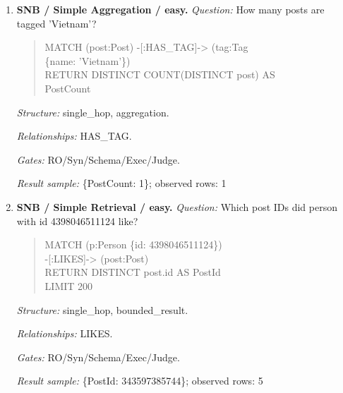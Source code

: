 \begin{enumerate}
\begin{quote}
RETURN DISTINCT e.id AS TargetId, e.name\\
AS TargetName, relatedCount\\
ORDER BY relatedCount DESC\\
LIMIT 10
\end{quote}
\textit{Structure:} single\_hop, aggregation, order\_rank, bounded\_result.\par
\textit{Relationships:} IS\_LOCATED\_IN.\par
\textit{Gates:} RO/Syn/Schema/Exec/Judge.\par
\textit{Result sample:} \{TargetId: 164, TargetName: Kolkata, relatedCount: 130\}; observed rows: 10
\item \textbf{SNB / Simple Aggregation / easy.}
\textit{Question:} How many posts are tagged 'Vietnam'?
\begin{quote}\scriptsize\ttfamily\raggedright\sloppy
MATCH (post:Post) -[:HAS\_TAG]-\textgreater{} (tag:Tag\\
\{name: 'Vietnam'\})\\
RETURN DISTINCT COUNT(DISTINCT post) AS\\
PostCount
\end{quote}
\textit{Structure:} single\_hop, aggregation.\par
\textit{Relationships:} HAS\_TAG.\par
\textit{Gates:} RO/Syn/Schema/Exec/Judge.\par
\textit{Result sample:} \{PostCount: 1\}; observed rows: 1
\item \textbf{SNB / Simple Retrieval / easy.}
\textit{Question:} Which post IDs did person with id 4398046511124 like?
\begin{quote}\scriptsize\ttfamily\raggedright\sloppy
MATCH (p:Person \{id: 4398046511124\})\\
-[:LIKES]-\textgreater{} (post:Post)\\
RETURN DISTINCT post.id AS PostId\\
LIMIT 200
\end{quote}
\textit{Structure:} single\_hop, bounded\_result.\par
\textit{Relationships:} LIKES.\par
\textit{Gates:} RO/Syn/Schema/Exec/Judge.\par
\textit{Result sample:} \{PostId: 343597385744\}; observed rows: 5
\end{enumerate}
